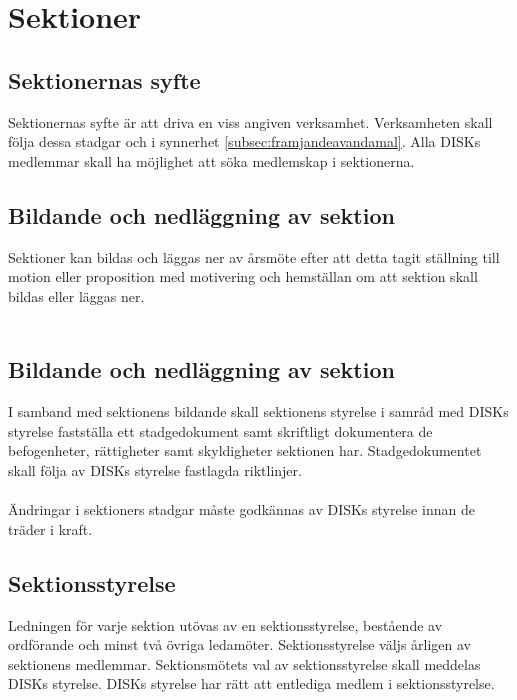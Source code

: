\clearpage
\section{Sektioner}
\label{sec:sektioner}

        \subsection{Sektionernas syfte}
        \label{subsec:sektionernassyfte}
                Sektionernas syfte är att driva en viss angiven verksamhet. Verksamheten skall följa dessa stadgar och i synnerhet \ref{subsec:framjandeavandamal}. Alla DISKs medlemmar skall ha möjlighet att söka medlemskap i sektionerna.

        \subsection{Bildande och nedläggning av sektion}
        \label{subsec:bildandeochnedlaggningavsektion}
                Sektioner kan bildas och läggas ner av årsmöte efter att detta tagit ställning till motion eller proposition med motivering och hemställan om att sektion skall bildas eller läggas ner.\\ \\
        \subsection{Bildande och nedläggning av sektion}
        \label{subsec:bildandeochnedlaggningavsektion}
                I samband med sektionens bildande skall sektionens styrelse i samråd med DISKs styrelse fastställa ett stadgedokument samt skriftligt dokumentera de befogenheter, rättigheter samt skyldigheter sektionen har. Stadgedokumentet skall följa av DISKs styrelse fastlagda riktlinjer. \\ \\

                Ändringar i sektioners stadgar måste godkännas av DISKs styrelse innan de träder i kraft.

        \subsection{Sektionsstyrelse}
        \label{subsec:sektionsstyrelse}
                Ledningen för varje sektion utövas av en sektionsstyrelse, bestående av ordförande och minst två övriga ledamöter. Sektionsstyrelse väljs årligen av sektionens medlemmar. Sektionsmötets val av sektionsstyrelse skall meddelas DISKs styrelse. DISKs styrelse har rätt att entlediga medlem i sektionsstyrelse.

